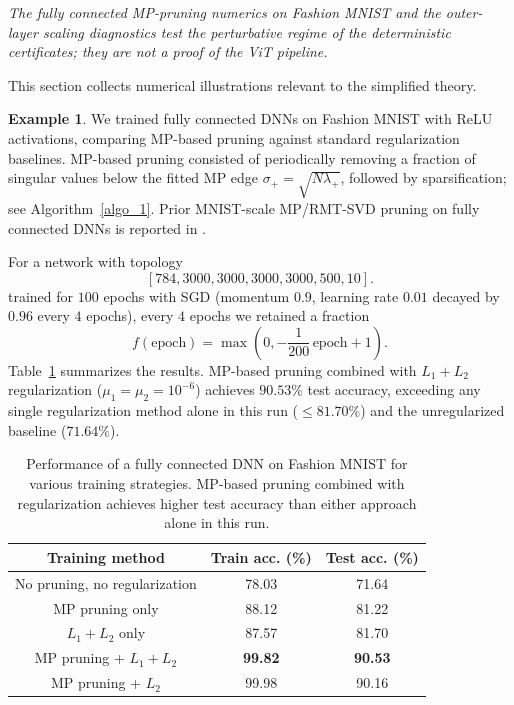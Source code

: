 \documentclass[11pt]{article}
\theoremstyle{plain}
\theoremstyle{definition}
\newtheorem{ex}[thm]{Example}
\theoremstyle{remark}
\newcommand{\1}{\mathbf{1}}
\begin{document}
\noindent\emph{The fully connected MP-pruning numerics on Fashion MNIST and the outer-layer scaling diagnostics test the perturbative regime of the deterministic certificates; they are not a proof of the ViT pipeline.}



\label{app:fc_num_legacy}

This section collects numerical illustrations relevant to the simplified theory.

\begin{ex}
\label{higher_acc_MP_based_training}
We trained fully connected DNNs on Fashion MNIST with ReLU activations, comparing MP-based pruning against standard regularization baselines. MP-based pruning consisted of periodically removing a fraction of singular values below the fitted MP edge \(\sigma_+=\sqrt{N\lambda_+}\), followed by sparsification; see Algorithm~\ref{algo_1}. Prior MNIST-scale MP/RMT-SVD pruning on fully connected DNNs is reported in \cite{shmalo2023deep,berlyand2023enhancing}.

For a network with topology
\[
[784,3000,3000,3000,3000,500,10].
\]
trained for \(100\) epochs with SGD (momentum \(0.9\), learning rate \(0.01\) decayed by \(0.96\) every \(4\) epochs), every \(4\) epochs we retained a fraction
\begin{equation}
\label{slow_prune}
f(\mathrm{epoch})=\max\left(0,-\frac1{200}\,\mathrm{epoch}+1\right).
\end{equation}
Table~\ref{full_connected_acc_results} summarizes the results. MP-based pruning combined with \(L_1+L_2\) regularization (\(\mu_1=\mu_2=10^{-6}\)) achieves \(90.53\%\) test accuracy, exceeding any single regularization method alone in this run (\(\le 81.70\%\)) and the unregularized baseline (\(71.64\%\)).
\end{ex}

\begin{table}[ht]
\centering
\begin{tabular}{|c|c|c|}
\hline
Training method & Train acc. (\%) & Test acc. (\%) \\
\hline
No pruning, no regularization & 78.03 & 71.64 \\
\hline
MP pruning only & 88.12 & 81.22 \\
\hline
\(L_1+L_2\) only & 87.57 & 81.70 \\
\hline
MP pruning + \(L_1+L_2\) & \textbf{99.82} & \textbf{90.53} \\
\hline
MP pruning + \(L_2\) & 99.98 & 90.16 \\
\hline
\end{tabular}
\caption{Performance of a fully connected DNN on Fashion MNIST for various training strategies. MP-based pruning combined with regularization achieves higher test accuracy than either approach alone in this run.}
\label{full_connected_acc_results}
\end{table}
\end{document}
